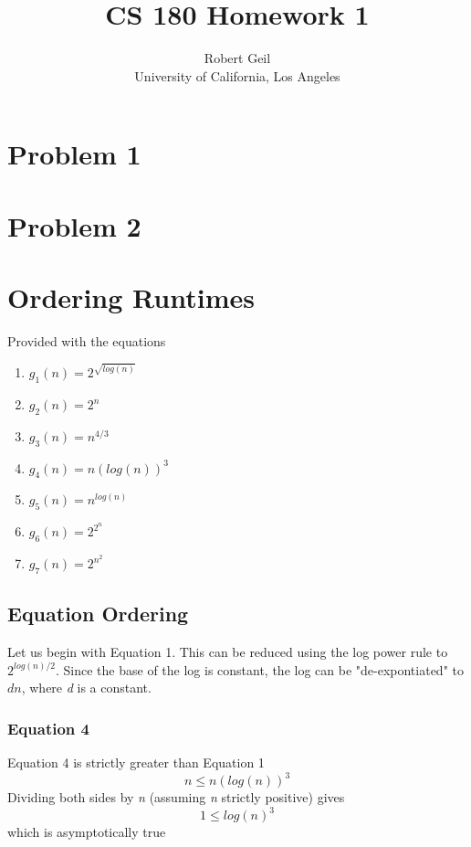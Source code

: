 \documentclass[titlepage]{article}
\title{CS 180 Homework 1}
\author{Robert Geil \\
University of California, Los Angeles
}
\numberwithin{equation}{subsection}
\begin{document}
\maketitle

\section{Problem 1}

\section{Problem 2}
\section{}
\section{Ordering Runtimes}
Provided with the equations
\begin{enumerate}
    \item $g_1(n) = 2^{\sqrt{log(n)}}$
    \item $g_2(n) = 2^n$
    \item $g_3(n) = n^{4/3}$
    \item $g_4(n) = n(log(n))^3$
    \item $g_5(n) = n^{log(n)}$
    \item $g_6(n) = 2^{2^n}$
    \item $g_7(n) = 2^{n^2}$
\end{enumerate}

\subsection{Equation Ordering}
Let us begin with Equation 1. This can be reduced using the log power rule to
$2^{log(n)/2}$. Since the base of the log is constant, the log can be "de-expontiated" to
$dn$, where \textit{d} is a constant.
\subsubsection{Equation 4}
    Equation 4 is strictly greater than Equation 1
    \begin{equation}
        n \leq n(log(n))^3
    \end{equation}
    Dividing both sides by \textit{n} (assuming \textit{n} strictly positive) gives
    \begin{equation}
        1 \leq log(n)^3
    \end{equation}
    which is asymptotically true
\end{document}
